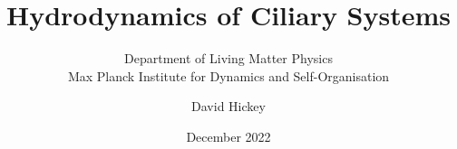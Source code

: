 \documentclass[
	a4paper, %
	fontsize=12pt, %
	twoside=false, %
	numbers=noenddot, %
]{kaobook}
\begin{document}

\subject{Doctoral Thesis}

\title{Hydrodynamics of Ciliary Systems}
\subtitle{
    Department of Living Matter Physics \\
    Max Planck Institute for Dynamics and Self-Organisation
}

\author{David Hickey}

\date{December 2022}



\frontmatter %

\makeatother











% 

\end{document}
